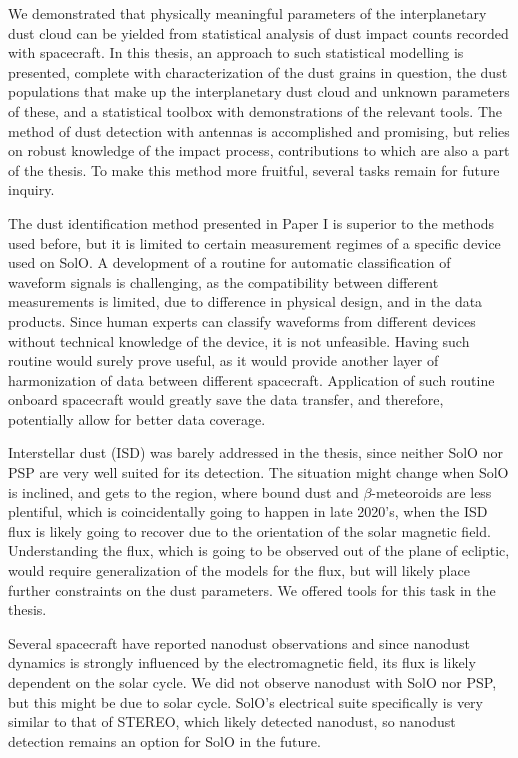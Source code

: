 We demonstrated that physically meaningful parameters of the interplanetary dust cloud can be yielded from statistical analysis of dust impact counts recorded with spacecraft. In this thesis, an approach to such statistical modelling is presented, complete with characterization of the dust grains in question, the dust populations that make up the interplanetary dust cloud and unknown parameters of these, and a statistical toolbox with demonstrations of the relevant tools. The method of dust detection with antennas is accomplished and promising, but relies on robust knowledge of the impact process, contributions to which are also a part of the thesis. To make this method more fruitful, several tasks remain for future inquiry.

The dust identification method presented in Paper I is superior to the methods used before, but it is limited to certain measurement regimes of a specific device used on SolO. A development of a routine for automatic classification of waveform signals is challenging, as the compatibility between different measurements is limited, due to difference in physical design, and in the data products. Since human experts can classify waveforms from different devices without technical knowledge of the device, it is not unfeasible. Having such routine would surely prove useful, as it would provide another layer of harmonization of data between different spacecraft. Application of such routine onboard spacecraft would greatly save the data transfer, and therefore, potentially allow for better data coverage.

Interstellar dust (ISD) was barely addressed in the thesis, since neither SolO nor PSP are very well suited for its detection. The situation might change when SolO is inclined, and gets to the region, where bound dust and $\beta$-meteoroids are less plentiful, which is coincidentally going to happen in late 2020's, when the ISD flux is likely going to recover due to the orientation of the solar magnetic field. Understanding the flux, which is going to be observed out of the plane of ecliptic, would require generalization of the models for the flux, but will likely place further constraints on the dust parameters. We offered tools for this task in the thesis.

Several spacecraft have reported nanodust observations and since nanodust dynamics is strongly influenced by the electromagnetic field, its flux is likely dependent on the solar cycle. We did not observe nanodust with SolO nor PSP, but this might be due to solar cycle. SolO's electrical suite specifically is very similar to that of STEREO, which likely detected nanodust, so nanodust detection remains an option for SolO in the future. 

